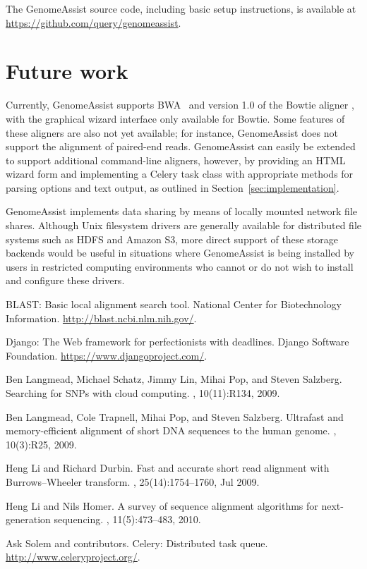 \documentclass[11pt,twocolumn]{article}
\begin{document}
The GenomeAssist source code, including basic setup instructions, is
available at \url{https://github.com/query/genomeassist}.


\section{Future work}

Currently, GenomeAssist supports BWA~\cite{BWA} and version 1.0 of the
Bowtie aligner \cite{Bowtie}, with the graphical wizard interface only
available for Bowtie.
Some features of these aligners are also not yet available; for
instance, GenomeAssist does not support the alignment of paired-end
reads.
GenomeAssist can easily be extended to support additional command-line
aligners, however, by providing an HTML wizard form and implementing a
Celery task class with appropriate methods for parsing options and text
output, as outlined in Section~\ref{sec:implementation}.

GenomeAssist implements data sharing by means of locally mounted network
file shares.
Although Unix filesystem drivers are generally available for distributed
file systems such as HDFS and Amazon S3, more direct support of these
storage backends would be useful in situations where GenomeAssist is
being installed by users in restricted computing environments who cannot
or do not wish to install and configure these drivers.


\begin{thebibliography}{1}

{BLAST}: Basic local alignment search tool.
\newblock National Center for Biotechnology Information.
  \url{http://blast.ncbi.nlm.nih.gov/}.

Django: The {Web} framework for perfectionists with deadlines.
\newblock Django Software Foundation. \url{https://www.djangoproject.com/}.

Ben Langmead, Michael Schatz, Jimmy Lin, Mihai Pop, and Steven Salzberg.
\newblock Searching for {SNPs} with cloud computing.
, 10(11):R134, 2009.

Ben Langmead, Cole Trapnell, Mihai Pop, and Steven Salzberg.
\newblock Ultrafast and memory-efficient alignment of short {DNA} sequences to
  the human genome.
, 10(3):R25, 2009.

Heng Li and Richard Durbin.
\newblock Fast and accurate short read alignment with {Burrows--Wheeler}
  transform.
, 25(14):1754--1760, Jul 2009.

Heng Li and Nils Homer.
\newblock A survey of sequence alignment algorithms for next-generation
  sequencing.
, 11(5):473--483, 2010.

Ask Solem and contributors.
\newblock Celery: Distributed task queue.
\newblock \url{http://www.celeryproject.org/}.

\end{thebibliography}
\end{document}
